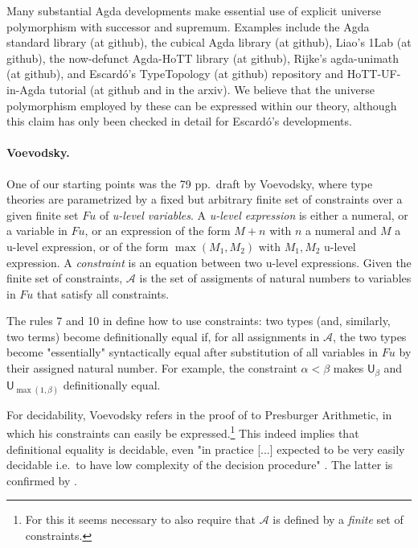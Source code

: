\documentclass[11pt,a4paper]{article}
\theoremstyle{definition}
\newcommand{\UU}{\mathsf{U}}
\newcommand{\AFu}{\mathcal{A}}
\newcommand{\Fu}{\mathit{Fu}}
\begin{document}
Many substantial Agda developments make essential use of explicit universe polymorphism with successor and supremum. Examples include the Agda standard library (at github), the cubical Agda library (at github), Liao's 1Lab (at github), the now-defunct Agda-HoTT library (at github), Rijke's agda-unimath (at
github), and Escard\'o's TypeTopology (at github) repository and 
HoTT-UF-in-Agda tutorial (at github and in the arxiv). We believe that the universe polymorphism employed by these can be expressed within our theory, although this claim has only been checked in detail for Escard\'o's developments.

\paragraph{Voevodsky.} One of our starting points was the 79 pp.\ draft \cite{VV} by Voevodsky, where type theories are parametrized by a fixed but arbitrary finite set of constraints over a given finite
set $\Fu$ of \emph{u-level variables}. A \emph{u-level expression} \cite[Def. 2.0.2]{VV} is either a numeral,
or a variable in $\Fu$, or an expression of the form $M+n$ with $n$
a numeral and $M$ a u-level expression, or of the form $\max(M_1,M_2)$
with $M_1,M_2$ u-level expression. A \emph{constraint} is an equation
between two u-level expressions. Given the finite set of constraints,
$\AFu$ is the set of assigments of natural numbers to variables
in $\Fu$ that satisfy all constraints.

The rules 7 and 10 in \cite[Section 3.4]{VV} define how to use constraints:
two types (and, similarly, two terms) become definitionally equal
if, for all assignments in $\AFu$, the two types become "essentially"
syntactically equal after substitution of all variables in $\Fu$ by
their assigned natural number. For example, the constraint
$\alpha < \beta$ makes $\UU_\beta$ and $\UU_{\max(1,\beta)}$
definitionally equal.

For decidability, Voevodsky refers in the proof of
\cite[Lemma 2.0.4, proof]{VV} to Presburger Arithmetic,
in which his constraints can easily be expressed.\footnote{%
For this it seems necessary to also require that $\AFu$
is defined by a \emph{finite} set of constraints.}%
This indeed implies that definitional equality is decidable, even
"in practice [...] expected to be very easily decidable i.e.\
to have low complexity of the decision procedure"
\cite[p.\ 5, l.\ -13]{VV}.
The latter is confirmed by \cite{bezem-coquand:lattices}.
\end{document}
